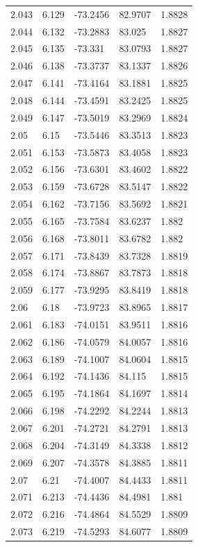 \begin{tabular}{lllll}
2.043 & 6.129 & -73.2456 & 82.9707 & 1.8828 \\
2.044 & 6.132 & -73.2883 & 83.025 & 1.8827 \\
2.045 & 6.135 & -73.331 & 83.0793 & 1.8827 \\
2.046 & 6.138 & -73.3737 & 83.1337 & 1.8826 \\
2.047 & 6.141 & -73.4164 & 83.1881 & 1.8825 \\
2.048 & 6.144 & -73.4591 & 83.2425 & 1.8825 \\
2.049 & 6.147 & -73.5019 & 83.2969 & 1.8824 \\
2.05 & 6.15 & -73.5446 & 83.3513 & 1.8823 \\
2.051 & 6.153 & -73.5873 & 83.4058 & 1.8823 \\
2.052 & 6.156 & -73.6301 & 83.4602 & 1.8822 \\
2.053 & 6.159 & -73.6728 & 83.5147 & 1.8822 \\
2.054 & 6.162 & -73.7156 & 83.5692 & 1.8821 \\
2.055 & 6.165 & -73.7584 & 83.6237 & 1.882 \\
2.056 & 6.168 & -73.8011 & 83.6782 & 1.882 \\
2.057 & 6.171 & -73.8439 & 83.7328 & 1.8819 \\
2.058 & 6.174 & -73.8867 & 83.7873 & 1.8818 \\
2.059 & 6.177 & -73.9295 & 83.8419 & 1.8818 \\
2.06 & 6.18 & -73.9723 & 83.8965 & 1.8817 \\
2.061 & 6.183 & -74.0151 & 83.9511 & 1.8816 \\
2.062 & 6.186 & -74.0579 & 84.0057 & 1.8816 \\
2.063 & 6.189 & -74.1007 & 84.0604 & 1.8815 \\
2.064 & 6.192 & -74.1436 & 84.115 & 1.8815 \\
2.065 & 6.195 & -74.1864 & 84.1697 & 1.8814 \\
2.066 & 6.198 & -74.2292 & 84.2244 & 1.8813 \\
2.067 & 6.201 & -74.2721 & 84.2791 & 1.8813 \\
2.068 & 6.204 & -74.3149 & 84.3338 & 1.8812 \\
2.069 & 6.207 & -74.3578 & 84.3885 & 1.8811 \\
2.07 & 6.21 & -74.4007 & 84.4433 & 1.8811 \\
2.071 & 6.213 & -74.4436 & 84.4981 & 1.881 \\
2.072 & 6.216 & -74.4864 & 84.5529 & 1.8809 \\
2.073 & 6.219 & -74.5293 & 84.6077 & 1.8809 \\

\end{tabular}
